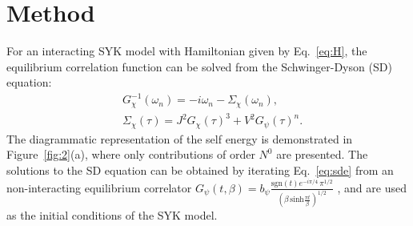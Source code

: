 \documentclass[prl,superscriptaddress,notitlepage,showpacs,twocolumn]{revtex4-2}
\begin{document}
\section{Method}

For an interacting SYK model with Hamiltonian given by Eq.~\eqref{eq:H}, the equilibrium correlation function can be solved from the Schwinger-Dyson (SD) equation:
\begin{align}
&G^{-1}_\chi(\omega_n)=-i\omega_n-\Sigma_\chi(\omega_n),\\ &\Sigma_\chi(\tau)=J^2G_\chi(\tau)^3+V^2G_\psi(\tau)^n.
\label{eq:sde}
\end{align}
The diagrammatic representation of the self energy is demonstrated in Figure~\ref{fig:2}(a), where only contributions of order $N^0$ are presented. The solutions to the SD equation can be obtained by iterating Eq.~\eqref{eq:sde} from an non-interacting equilibrium correlator 
$ G_\psi(t,\beta)=b_\psi\frac{\mathrm{sgn}(t)e^{-i\pi/4}\,\pi^{1/2}}{\left(\beta\, \mathrm{sinh}\frac{\pi t}{\beta}\right)^{1/2}}$ \cite{maldacena2016remarks},
and are used as the initial conditions of the SYK model. 
\end{document}

